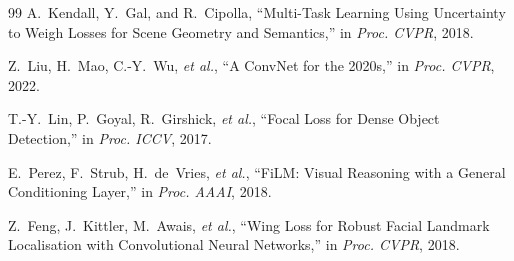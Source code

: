 \documentclass[10pt,twocolumn]{article}
\begin{document}
\begin{thebibliography}{99}
A.~Kendall, Y.~Gal, and R.~Cipolla,
``Multi-Task Learning Using Uncertainty to Weigh Losses for Scene Geometry and Semantics,''
in \emph{Proc. CVPR}, 2018.

Z.~Liu, H.~Mao, C.-Y.~Wu, \emph{et al.},
``A ConvNet for the 2020s,''
in \emph{Proc. CVPR}, 2022.

T.-Y.~Lin, P.~Goyal, R.~Girshick, \emph{et al.},
``Focal Loss for Dense Object Detection,''
in \emph{Proc. ICCV}, 2017.

E.~Perez, F.~Strub, H.~de~Vries, \emph{et al.},
``FiLM: Visual Reasoning with a General Conditioning Layer,''
in \emph{Proc. AAAI}, 2018.

Z.~Feng, J.~Kittler, M.~Awais, \emph{et al.},
``Wing Loss for Robust Facial Landmark Localisation with Convolutional Neural Networks,''
in \emph{Proc. CVPR}, 2018.

\end{thebibliography}
\end{document}
